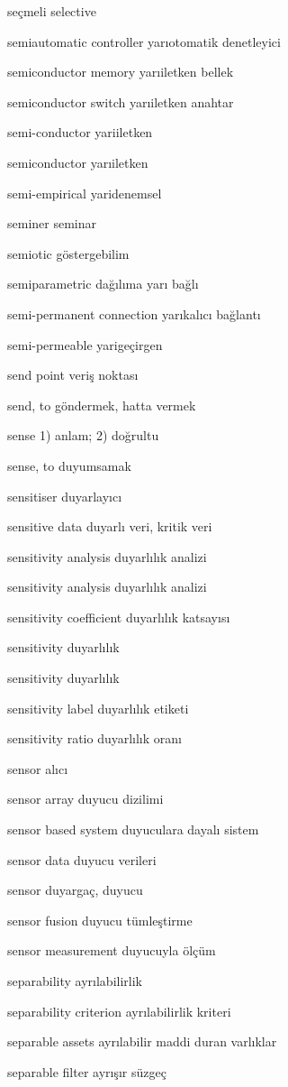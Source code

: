 \documentclass[12pt,fleqn]{article}\usepackage{../../common}
\begin{document}
seçmeli selective

semiautomatic controller yarıotomatik denetleyici

semiconductor memory yarıiletken bellek

semiconductor switch yarıiletken anahtar

semi-conductor yariiletken

semiconductor yarıiletken

semi-empirical yaridenemsel

seminer seminar

semiotic göstergebilim

semiparametric dağılıma yarı bağlı

semi-permanent connection yarıkalıcı bağlantı

semi-permeable yarigeçirgen

send point veriş noktası

send, to göndermek, hatta vermek

sense 1) anlam; 2) doğrultu

sense, to duyumsamak

sensitiser duyarlayıcı

sensitive data duyarlı veri, kritik veri

sensitivity analysis duyarlılık analizi

sensitivity analysis duyarlılık analizi

sensitivity coefficient duyarlılık katsayısı

sensitivity duyarlılık

sensitivity duyarlılık

sensitivity label duyarlılık etiketi

sensitivity ratio duyarlılık oranı

sensor alıcı

sensor array duyucu dizilimi

sensor based system duyuculara dayalı sistem

sensor data duyucu verileri

sensor duyargaç, duyucu

sensor fusion duyucu tümleştirme

sensor measurement duyucuyla ölçüm

separability ayrılabilirlik

separability criterion ayrılabilirlik kriteri

separable assets ayrılabilir maddi duran varlıklar

separable filter ayrışır süzgeç
\end{document}
